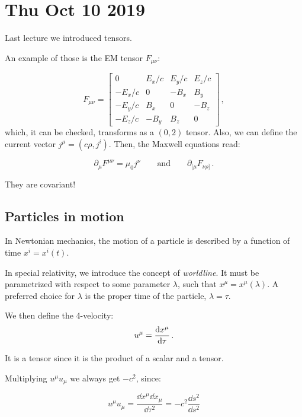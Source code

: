\documentclass[main.tex]{subfiles}
\begin{document}
\section*{Thu Oct 10 2019}

Last lecture we introduced tensors.

An example of those is the EM tensor \(F_{\mu \nu}\):

\begin{equation}
  F_{\mu \nu} = \left[\begin{array}{cccc}
  0 & E_{x}/c & E_y/c & E_z/c \\ 
  -E_x/c & 0 & -B_x & B_y \\ 
  -E_y/c & B_x & 0 & -B_z \\ 
  -E_z/c & -B_y & B_z & 0
  \end{array}\right]\,,
\end{equation}
%
which, it can be checked, transforms as a \((0,2)\) tensor. Also, we can define the current vector \(j^{\mu} = (c \rho, j^{i})\). Then, the Maxwell equations read:

\begin{equation}
  \partial_{\mu} F^{\mu \nu }= \mu_0 j^{\nu}
  \qquad \text{and} \qquad
  \partial_{[\mu} F_{\nu \rho]}\,.
\end{equation}

They are covariant!

\subsection{Particles in motion}

In Newtonian mechanics, the motion of a particle is described by a function of time \(x^{i} = x^{i}(t)\).

In special relativity, we introduce the concept of \emph{worldline}.
It must be parametrized with respect to some parameter \(\lambda\), such that \(x^{\mu} = x^{\mu}(\lambda)\). A preferred choice for \(\lambda\) is the proper time of the particle, \(\lambda = \tau\).

We then define the 4-velocity:
%
\begin{equation}
  u^\mu = \dv{x ^\mu}{\tau} \,.
\end{equation}

It is a tensor since it is the product of a scalar and a tensor.

Multiplying \(u^\mu u_{\mu}\) we always get \(-c^{2}\), since:

\begin{equation}
  u^{\mu} u_{\mu} = \frac{\dd{x^{\mu}} \dd{x_{\mu}}}{\dd{\tau^{2}}} = -c^2 \frac{\dd{s^{2}}}{\dd{s^2}}
\end{equation}
\end{document}
